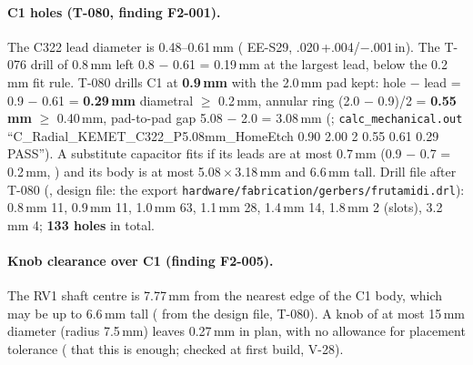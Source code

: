 \paragraph{C1 holes (T-080, finding F2-001).} The C322 lead diameter is
0.48--0.61\,mm ( EE-S29, .020\,+.004/$-$.001\,in). The T-076 drill of
0.8\,mm left 0.8 $-$ 0.61 = 0.19\,mm at the largest lead, below the 0.2\,mm fit
rule. T-080 drills C1 at \textbf{0.9\,mm} with the 2.0\,mm pad kept: hole $-$ lead
= 0.9 $-$ 0.61 = \textbf{0.29\,mm} diametral $\ge$ 0.2\,mm, annular ring
(2.0 $-$ 0.9)/2 = \textbf{0.55\,mm} $\ge$ 0.40\,mm, pad-to-pad gap 5.08 $-$ 2.0 =
3.08\,mm (; \nolinkurl{calc_mechanical.out}
``C\_Radial\_KEMET\_C322\_P5.08mm\_HomeEtch 0.90 2.00 2 0.55 0.61 0.29 PASS'').
A substitute capacitor fits if its leads are at most 0.7\,mm (0.9 $-$ 0.7 = 0.2\,mm,
) and its body is at most 5.08\,$\times$\,3.18\,mm and 6.6\,mm
tall. Drill file after T-080 (, design file: the export
\nolinkurl{hardware/fabrication/gerbers/frutamidi.drl}): 0.8\,mm 11, 0.9\,mm 11,
1.0\,mm 63, 1.1\,mm 28, 1.4\,mm 14, 1.8\,mm 2 (slots), 3.2\,mm 4; \textbf{133 holes}
in total.

\paragraph{Knob clearance over C1 (finding F2-005).} The RV1 shaft centre is
7.77\,mm from the nearest edge of the C1 body, which may be up to 6.6\,mm tall
( from the design file, T-080). A knob of at
most 15\,mm diameter (radius 7.5\,mm) leaves 0.27\,mm in plan, with no allowance for
placement tolerance ( that this is enough; checked at first build,
V-28).

